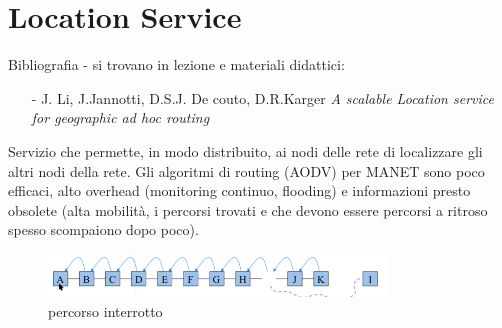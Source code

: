 \documentclass[12pt,italian]{report}
\begin{document}
\chapter{Location Service}
Bibliografia - si trovano in lezione e materiali didattici: 
\begin{itemize}
    \item[-]J. Li, J.Jannotti, D.S.J. De couto, D.R.Karger
    \textit{A scalable Location service for geographic ad hoc routing}
\end{itemize}
Servizio che permette, in modo distribuito, ai nodi delle rete di localizzare gli altri nodi della rete. 
\bigbreak
Gli algoritmi di routing (AODV) per MANET sono poco efficaci, alto overhead (monitoring continuo, flooding) e informazioni presto obsolete (alta mobilità, i percorsi trovati e che devono essere percorsi a ritroso spesso scompaiono dopo poco).
\begin{figure}[h]
\centering
\includegraphics[width=90mm]{img/aodv.PNG}
\caption{percorso interrotto}
\label{fig:perinte}
\end{figure}
\end{document}
